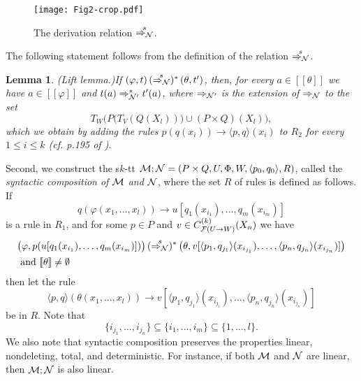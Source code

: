 \documentclass[10pt]{scrartcl}
\newtheorem{lm}[df]{Lemma}
\newcommand{\seml}{[\![}
\newcommand{\semr}{]\!]}
\newcommand{\M}{{\cal M}}
\newcommand{\N}{{\cal N}}
\begin{document}
\begin{figure}
\begin{center}
\texttt{[image: Fig2-crop.pdf]}
\caption{\label{fig:synt-comp-derivation} The derivation relation $\stackrel{s}{\Rightarrow_{\N}}$.} 
\end{center}
\end{figure}

The following statement follows from the definition of the relation $\stackrel{s}{\Rightarrow_{\N}}$.

\begin{lm}\rm(Lift lemma.)\label{lift-lemma} If $(\varphi,t) \,
  (\stackrel{s}{\Rightarrow_{\N}})^* \, (\theta,t')$, then, for every $
  a\in \seml \theta\semr$ we have $ a\in \seml\varphi \semr$
and $t(a) \Rightarrow_{\N'}^* t'(a)$, where $\Rightarrow_{\N'}$ is the extension of $\Rightarrow_{\N}$ to the set 
\[
 T_W\Big(P\big(T_V\left(Q\left(X_l\right)\right)\big)\cup (P\times Q)\left(X_l\right)\Big),
\]
which we obtain by adding the rules $p(q(x_i)) \rightarrow \langle
p,q\rangle(x_i)$ to $R_2$ for every $1 \le i \le k$ (cf. p.195 of \cite{bak79}).
\end{lm}





Second, we construct the s$k$-tt $\M;\N = (P \times Q, U, \Phi,W,\langle p_{0},q_{0}\rangle,R)$,
called the {\em syntactic composition of  $\M$ and $\N$}, where 
the set $R$ of rules is defined as follows. If
\begin{equation} \label{rule-1}
q(\varphi(x_1,\ldots,x_l)) \rightarrow u[q_1(x_{i_1}),\ldots,q_m(x_{i_m})]
\end{equation}
is a rule in $R_1$, and for some $p \in P$ and $v \in C^{(k)}_{{\cal
    F}(U \rightarrow W)}(X_n)$ we have 
\begin{align}\label{derivation-2}
&\big(\varphi,p(u[q_1(x_{i_1}),\ldots,q_m(x_{i_m})])\big) \,
(\stackrel{s}{\Rightarrow_{\N}})^* \, \big(\theta,v[\langle p_1,
q_{j_1}\rangle (x_{i_{j_1}}),\ldots,\langle p_n, q_{j_n}\rangle
(x_{i_{j_n}})]\big)\\ 
&\text{ and } \seml \theta \semr \not= \emptyset \notag
\end{align}
then let the rule
\begin{equation}\label{rule-big}
\langle p,q\rangle(\theta(x_1,\ldots,x_l)){\rightarrow} v[\langle p_1, q_{j_1}\rangle (x_{i_{j_1}}),\ldots,\langle p_n, q_{j_n}\rangle (x_{i_{j_n}})]
\end{equation}
be in $R$. Note that
\[\{i_{j_1},\ldots,i_{j_n}\}\subseteq \{i_1,\ldots,i_m\} \subseteq \{1,\ldots,l\}.\]
We also note that syntactic composition preserves the properties
linear, nondeleting, total, and deterministic. For instance, if both
$\M$ and $\N$ are linear, then $\M;\N$ is also linear. 
\end{document}
